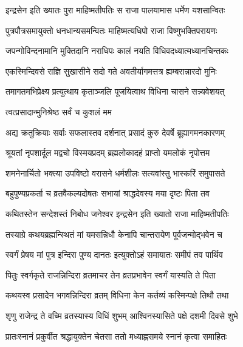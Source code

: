 \twolineshloka
{इन्द्रसेन इति ख्यातः पुरा माहिष्मतीपतिः}
{स राजा पालयामास धर्मेण यशसान्वितः}%

\twolineshloka
{पुत्रपौत्रसमायुक्तो धनधान्यसमन्वितः}
{माहिष्मत्यधिपो राजा विष्णुभक्तिपरायणः}%

\twolineshloka
{जपन्गोविन्दनामानि मुक्तिदानि नराधिपः}
{कालं नयति विधिवदध्यात्मध्यानचिन्तकः}%

\twolineshloka
{एकस्मिन्दिवसे राज्ञि सुखासीने सदो गते}
{अवतीर्यागमत्तत्र ह्यम्बरान्नारदो मुनिः}%

\twolineshloka
{तमागतमभिप्रेक्ष्य प्रत्युत्थाय कृताञ्जलि}
{पूजयित्वाथ विधिना चासने सन्न्यवेशयत्}%

\onelineshloka
{त्वत्प्रसादान्मुनिश्रेष्ठ सर्वं च कुशलं मम}%

\twolineshloka
{अद्य क्रतुक्रियाः सर्वाः सफलास्तव दर्शनात्}
{प्रसादं कुरु देवर्षे ब्रूह्यागमनकारणम्}%


\twolineshloka
{श्रूयतां नृपशार्दूल मद्वचो विस्मयप्रदम्}
{ब्रह्मलोकादहं प्राप्तो यमलोकं नृपोत्तम}%

\twolineshloka
{शमनेनार्चितो भक्त्या उपविष्टो वरासने}
{धर्मशीलः सत्यवांस्तु भास्करिं समुपासते}%

\twolineshloka
{बहुपुण्यप्रकर्ता च व्रतवैकल्यदोषतः}
{सभायां श्राद्धदेवस्य मया दृष्टः पिता तव}%

\twolineshloka
{कथितस्तेन सन्देशस्तं निबोध जनेश्वर}
{इन्द्रसेन इति ख्यातो राजा माहिष्मतीपतिः}%

\twolineshloka
{तस्याग्रे कथयब्रह्मन्स्थितं मां यमसन्निधौ}
{केनापि चान्तरायेण पूर्वजन्मोद्भवेन च}%

\twolineshloka
{स्वर्गं प्रेषय मां पुत्र इन्दिरा पुण्य दानतः}
{इत्युक्तोऽहं समायातः समीपं तव पार्थिव}%

\twolineshloka
{पितुः स्वर्गकृते राजन्निन्दिरा व्रतमाचर}
{तेन व्रतप्रभावेन स्वर्गं यास्यति ते पिता}%


\twolineshloka
{कथयस्व प्रसादेन भगवन्निन्दिरा व्रतम्}
{विधिना केन कर्तव्यं कस्मिन्पक्षे तिथौ तथा}%


\twolineshloka
{शृणु राजेन्द्र ते वच्मि व्रतस्यास्य विधिं शुभम्}
{आश्विनस्यासिते पक्षे दशमी दिवसे शुभे}%

\twolineshloka
{प्रातःस्नानं प्रकुर्वीत श्रद्धायुक्तेन चेतसा}
{ततो मध्याह्नसमये स्नानं कृत्वा समाहितः}%

